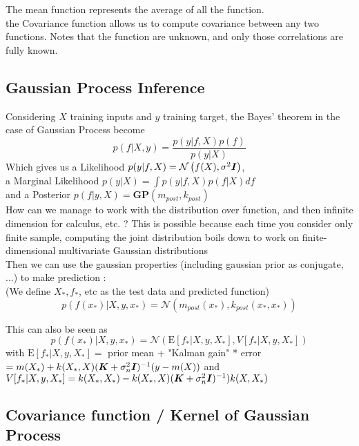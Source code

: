 			The mean function represents the average of all the function.\\
			the Covariance function allows us to compute covariance between any two functions. Notes that the function are unknown, and only those correlations are fully known.

		\subsection{Gaussian Process Inference} %
		\label{sub:gaussian_process_inference}
				
			Considering $X$ training inputs and $y$ training target, the Bayes' theorem in the case of Gaussian Process become 
			\[
				p(f | X, y) = \frac{p(y | f, X)p(f)}{p(y | X)}
			\]
			Which gives us a Likelihood $p(y | f, X) = \mathcal{N}\left(f(X), \sigma^2 {\boldsymbol{{I}}}\right)$,\\
			 a Marginal Likelihood $p(y | X) = \int p(y | f, X) p (f | X) df$ \\
			 and a Posterior $p(f |y, X) = \textbf{GP}(m_{post}, k_{post})$\\
			How can we manage to work with the distribution over function, and then infinite dimension for calculus, etc. ? This is possible because each time you consider only finite sample, computing the joint distribution boils down to work on finite-dimensional multivariate Gaussian distributions\\
			Then we can use the gaussian properties (including gaussian prior as conjugate, ...) to make prediction : \\
			(We define $X_*, f_*$, etc as the test data and predicted function)
			\[
				p(f(x_*) | X, y, x_*) = \mathcal{N}(m_{post}(x_*), k_{post}(x_*, x_*))
			\]

			This can also be seen as 
			\[
				p(f(x_*) | X, y, x_*) = \mathcal{N}(\text{E}{[f_* | X, y, X_*]}, V{[f_* | X, y, X_*]})
			\]
			with $\text{E}[f_* | X, y, X_*] =$ prior mean + "Kalman gain" * error $= m(X_*) + k(X_*, X)({\boldsymbol{{K}}} + \sigma^2_n {\boldsymbol{{I}}})^{-1}(y-m(X))$ and $V [f_* | X, y, X_*] = k(X_*, X_*) - k(X_*, X)({\boldsymbol{{K}}} + \sigma^2_n {\boldsymbol{{I}}})^{-1})k(X, X_*)$


		\subsection{Covariance function / Kernel of Gaussian Process}

